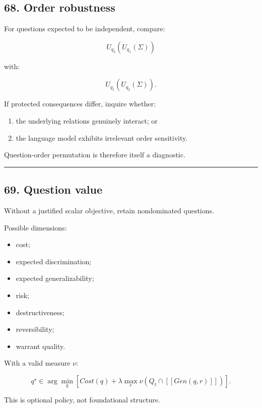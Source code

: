 \documentclass[
]{article}
\providecommand{\tightlist}{%
  \setlength{\itemsep}{0pt}\setlength{\parskip}{0pt}}
\begin{document}
\subsection{68. Order robustness}\label{order-robustness}

For questions expected to be independent, compare:

\[
U_{q_2}(U_{q_1}(\Sigma))
\]

with:

\[
U_{q_1}(U_{q_2}(\Sigma)).
\]

If protected consequences differ, inquire whether:

\begin{enumerate}
\def\labelenumi{\arabic{enumi}.}
\tightlist
\item
  the underlying relations genuinely interact; or
\item
  the language model exhibits irrelevant order sensitivity.
\end{enumerate}

Question-order permutation is therefore itself a diagnostic.

\begin{center}\rule{0.5\linewidth}{0.5pt}\end{center}

\subsection{69. Question value}\label{question-value}

Without a justified scalar objective, retain nondominated questions.

Possible dimensions:

\begin{itemize}
\tightlist
\item
  cost;
\item
  expected discrimination;
\item
  expected generalizability;
\item
  risk;
\item
  destructiveness;
\item
  reversibility;
\item
  warrant quality.
\end{itemize}

With a valid measure \(\nu\):

\[
q^\star
\in
\arg\min_q
\left[
Cost(q)
+
\lambda
\max_r
\nu
(
Q_t\cap[\![Gen(q,r)]\!]
)
\right].
\]

This is optional policy, not foundational structure.
\end{document}
